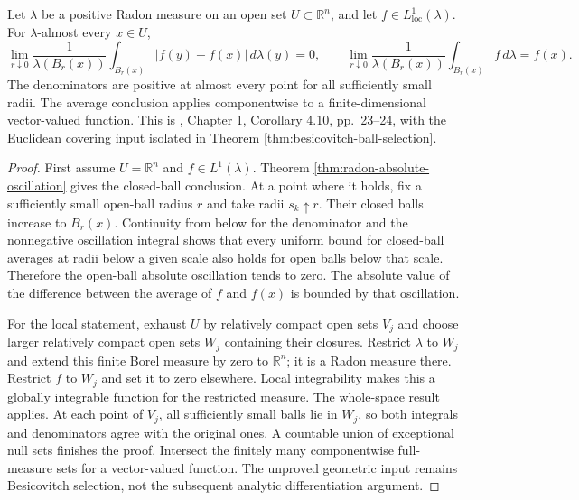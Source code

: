 \begin{theorem}\label{thm:radon-function-differentiation}
Let $\lambda$ be a positive Radon measure on an open set $U\subset\mathbb R^n$, and let $f\in L^1_{\mathrm{loc}}(\lambda)$. For $\lambda$-almost every $x\in U$,
\[
 \lim_{r\downarrow0}\frac{1}{\lambda(B_r(x))}
       \int_{B_r(x)}|f(y)-f(x)|\,d\lambda(y)=0,
 \qquad
 \lim_{r\downarrow0}\frac{1}{\lambda(B_r(x))}
       \int_{B_r(x)}f\,d\lambda=f(x).
\]
The denominators are positive at almost every point for all sufficiently small radii. The average conclusion applies componentwise to a finite-dimensional vector-valued function. This is \cite{Sim18}, Chapter 1, Corollary 4.10, pp.~23--24, with the Euclidean covering input isolated in Theorem \ref{thm:besicovitch-ball-selection}.
\end{theorem}
\begin{proof}
First assume $U=\mathbb R^n$ and $f\in L^1(\lambda)$. Theorem \ref{thm:radon-absolute-oscillation} gives the closed-ball conclusion. At a point where it holds, fix a sufficiently small open-ball radius $r$ and take radii $s_k\uparrow r$. Their closed balls increase to $B_r(x)$. Continuity from below for the denominator and the nonnegative oscillation integral shows that every uniform bound for closed-ball averages at radii below a given scale also holds for open balls below that scale. Therefore the open-ball absolute oscillation tends to zero. The absolute value of the difference between the average of $f$ and $f(x)$ is bounded by that oscillation.

For the local statement, exhaust $U$ by relatively compact open sets $V_j$ and choose larger relatively compact open sets $W_j$ containing their closures. Restrict $\lambda$ to $W_j$ and extend this finite Borel measure by zero to $\mathbb R^n$; it is a Radon measure there. Restrict $f$ to $W_j$ and set it to zero elsewhere. Local integrability makes this a globally integrable function for the restricted measure. The whole-space result applies. At each point of $V_j$, all sufficiently small balls lie in $W_j$, so both integrals and denominators agree with the original ones. A countable union of exceptional null sets finishes the proof. Intersect the finitely many componentwise full-measure sets for a vector-valued function. The unproved geometric input remains Besicovitch selection, not the subsequent analytic differentiation argument.
\end{proof}
